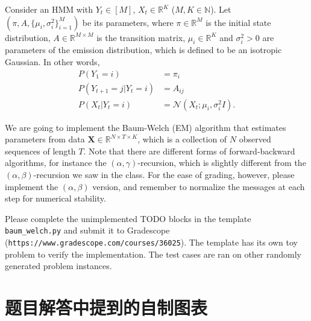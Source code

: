 \documentclass[12pt]{article}
\newcommand{\Ncal}{\mathcal{N}}
\begin{document}
\begin{figure}[h]
	\centering
\end{figure}

Consider an HMM with $ Y_t \in [M] $, $ X_t \in \mathbb{R}^{K} $ ($ M, K \in \mathbb{N} $).
Let $ (\pi, A, \{\mu_i, \sigma_i^2\}_{i=1}^M) $ be its parameters, where $ \pi \in \mathbb{R}^{M} $ is the initial state distribution, $ A \in \mathbb{R}^{M \times M} $ is the transition matrix, $ \mu_i \in \mathbb{R}^{K} $ and $ \sigma_i^2 > 0 $ are parameters of the emission distribution, which is defined to be an isotropic Gaussian.
In other words,
\begin{align}
	P(Y_1 = i)               & = \pi_{i}                          \\
	P(Y_{t+1} = j | Y_t = i) & = A_{ij}                           \\
	P(X_t | Y_t = i)         & = \Ncal(X_t; \mu_i, \sigma_i^2 I).
\end{align}


We are going to implement the Baum-Welch (EM) algorithm that estimates parameters from data $ \boldsymbol{X} \in \mathbb{R}^{N \times T \times K} $, which is a collection of $ N $ observed sequences of length $ T $.
Note that there are different forms of forward-backward algorithms, for instance the $ (\alpha,\gamma) $-recursion, which is slightly different from the $ (\alpha,\beta)$-recursion we saw in the class.
For the ease of grading, however, please implement the $ (\alpha,\beta) $ version, and remember to normalize the messages at each step for numerical stability.


Please complete the unimplemented TODO blocks in the template \verb|baum_welch.py| and submit it to Gradescope (\verb|https://www.gradescope.com/courses/36025|).
The template has its own toy problem to verify the implementation.
The test cases are ran on other randomly generated problem instances.



\newpage



\newpage
\appendix
\section{题目解答中提到的自制图表}
\end{document}
